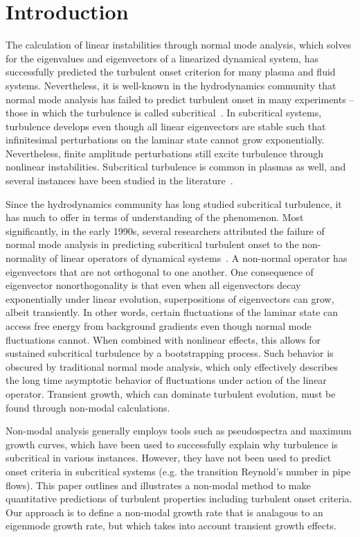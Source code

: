 \documentclass[twocolumn,showkeys,superscriptaddress]{revtex4}
\begin{document}
\section{Introduction}

The calculation of linear instabilities through normal mode analysis, which solves for the eigenvalues and eigenvectors of a linearized dynamical system,
has successfully predicted the turbulent onset criterion for many plasma and fluid systems.
Nevertheless, it is well-known in the hydrodynamics community that normal mode analysis has failed to predict turbulent onset in many experiments -- those in which the
turbulence is called subcritical~\cite{drazin1981}. 
In subcritical systems, turbulence develops even though all linear eigenvectors are stable such that infinitesimal perturbations on the laminar state cannot grow exponentially. 
Nevertheless, finite amplitude perturbations still excite turbulence through nonlinear instabilities.
Subcritical turbulence is common in plasmas as well, and several instances have been studied in the literature~\cite{waltz1985,scott1990,nordman1993,biskamp1995,drake1995,itoh1996,camargo1998,krommes1999,camporeale2009,schekochihin2012,highcock2012}. 

Since the hydrodynamics community has long studied subcritical turbulence, it has much to offer in terms of understanding of the phenomenon. Most significantly,
in the early 1990s, several researchers attributed the failure of normal mode analysis in predicting subcritical turbulent onset to the non-normality of linear operators of
dynamical systems~\cite{gustavsson1991,butler1992,trefethen1993,reddy1993,henningson1994,schmid2007}. A non-normal operator has 
eigenvectors that are not orthogonal to one another. One consequence of eigenvector nonorthogonality is that even when all eigenvectors decay exponentially under linear evolution, 
superpositions of eigenvectors can grow, albeit transiently.
In other words, certain fluctuations of the laminar state can access free energy from background gradients even though normal mode fluctuations cannot.
When combined with nonlinear effects, this allows for sustained subcritical turbulence by a bootstrapping process.
Such behavior is obscured by traditional normal mode analysis, which only effectively describes the long time asymptotic behavior of fluctuations under  
action of the linear operator. Transient growth, which can dominate turbulent evolution, must be found through non-modal calculations.

Non-modal analysis generally employs tools such as pseudospectra and maximum growth curves, which have been used to successfully explain why turbulence is subcritical in various instances. 
However, they have not been used to predict onset criteria in subcritical systems (e.g. the transition Reynold's number in pipe flows).
This paper outlines and illustrates a non-modal method to make quantitative predictions of turbulent properties including turbulent onset criteria. 
Our approach is to define a non-modal growth rate that is analagous to an eigenmode growth rate, but which takes into account transient growth effects. 
\end{document}
